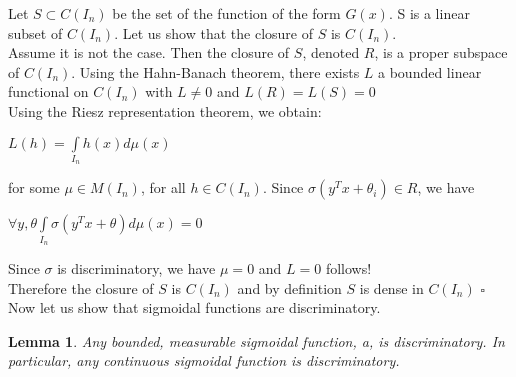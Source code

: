 \documentclass[12pt, a4paper]{article}
\newtheorem{lemma}{Lemma}
\newenvironment{proof}{{\sc Proof:}}{\hfill $\square$}
\begin{document}
\begin{proof}
  Let $S \subset C(I_n)$ be the set of the function of the form $G(x)$. S is a linear subset of $C(I_n)$. Let us show that the closure of $S$ is $C(I_n)$.\\

  Assume it is not the case. Then the closure of $S$, denoted $R$, is a proper subspace of $C(I_n)$. Using the Hahn-Banach theorem, there exists $L$ a bounded linear functional on $C(I_n)$ with $L \ne 0$ and  $L(R) = L(S) = 0$\\

  Using the Riesz representation theorem, we obtain:
  \begin{center}
    $L(h) = \int\limits_{I_n} h(x)d\mu(x)$
  \end{center}
  for some $\mu \in M(I_n)$, for all $h\in C(I_n)$. Since $\sigma(y^Tx + \theta_i)  \in R$, we have
  \begin{center}
    $\forall y, \theta \int\limits_{I_n} \sigma(y^Tx + \theta) d\mu(x) = 0$
  \end{center}
  Since $\sigma$ is discriminatory, we have $\mu = 0$ and $L = 0$ follows!\\
  
  Therefore the closure of $S$ is $C(I_n)$ and by definition $S$ is dense in $C(I_n)$
\end{proof}\\
\Sv
  Now let us show that sigmoidal functions are discriminatory.
  \begin{lemma}
    Any bounded, measurable sigmoidal function, a, is discriminatory. In particular, any continuous sigmoidal function is discriminatory.
  \end{lemma}
\end{document}
